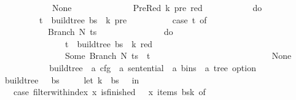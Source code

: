 \begin{isabellebody}
\ \ \ \ \ \ \ \ \ \ {\isacharbar}{\kern0pt}\ {\isacharunderscore}{\kern0pt}\ {\isasymRightarrow}\ None\isanewline
\ \ \ \ \ \ \ \ {\isacharbraceright}{\kern0pt}{\isacharparenright}{\kern0pt}\isanewline
\ \ \ \ {\isacharbar}{\kern0pt}\ PreRed\ {\isacharparenleft}{\kern0pt}k{\isacharprime}{\kern0pt}{\isacharcomma}{\kern0pt}\ pre{\isacharcomma}{\kern0pt}\ red{\isacharparenright}{\kern0pt}\ {\isacharunderscore}{\kern0pt}\ {\isasymRightarrow}\ {\isacharparenleft}{\kern0pt}\isanewline
\ \ \ \ \ \ \ \ do\ {\isacharbraceleft}{\kern0pt}\isanewline
\ \ \ \ \ \ \ \ \ \ t\ {\isasymleftarrow}\ build{\isacharunderscore}{\kern0pt}tree{\isacharprime}{\kern0pt}\ bs\ {\isasymomega}\ k{\isacharprime}{\kern0pt}\ pre{\isacharsemicolon}{\kern0pt}\isanewline
\ \ \ \ \ \ \ \ \ \ case\ t\ of\isanewline
\ \ \ \ \ \ \ \ \ \ \ \ Branch\ N\ ts\ {\isasymRightarrow}\isanewline
\ \ \ \ \ \ \ \ \ \ \ \ \ \ do\ {\isacharbraceleft}{\kern0pt}\isanewline
\ \ \ \ \ \ \ \ \ \ \ \ \ \ \ \ t\ {\isasymleftarrow}\ build{\isacharunderscore}{\kern0pt}tree{\isacharprime}{\kern0pt}\ bs\ {\isasymomega}\ k\ red{\isacharsemicolon}{\kern0pt}\isanewline
\ \ \ \ \ \ \ \ \ \ \ \ \ \ \ \ Some\ {\isacharparenleft}{\kern0pt}Branch\ N\ {\isacharparenleft}{\kern0pt}ts\ {\isacharat}{\kern0pt}\ {\isacharbrackleft}{\kern0pt}t{\isacharbrackright}{\kern0pt}{\isacharparenright}{\kern0pt}{\isacharparenright}{\kern0pt}\isanewline
\ \ \ \ \ \ \ \ \ \ \ \ \ \ {\isacharbraceright}{\kern0pt}\isanewline
\ \ \ \ \ \ \ \ \ \ {\isacharbar}{\kern0pt}\ {\isacharunderscore}{\kern0pt}\ {\isasymRightarrow}\ None\isanewline
\ \ \ \ \ \ \ \ {\isacharbraceright}{\kern0pt}{\isacharparenright}{\kern0pt}\isanewline
\ \ {\isacharparenright}{\kern0pt}{\isacharparenright}{\kern0pt}{\isachardoublequoteclose}\isanewline
\isanewline
{}\isamarkupfalse%
\ build{\isacharunderscore}{\kern0pt}tree\ {\isacharcolon}{\kern0pt}{\isacharcolon}{\kern0pt}\ {\isachardoublequoteopen}{\isacharprime}{\kern0pt}a\ cfg\ {\isasymRightarrow}\ {\isacharprime}{\kern0pt}a\ sentential\ {\isasymRightarrow}\ {\isacharprime}{\kern0pt}a\ bins\ {\isasymRightarrow}\ {\isacharprime}{\kern0pt}a\ tree\ option{\isachardoublequoteclose}\ \isanewline
\ \ {\isachardoublequoteopen}build{\isacharunderscore}{\kern0pt}tree\ {\isasymG}\ {\isasymomega}\ bs\ {\isasymequiv}\isanewline
\ \ \ \ let\ k\ {\isacharequal}{\kern0pt}\ {\isacharbar}{\kern0pt}bs{\isacharbar}{\kern0pt}\ {\isacharminus}{\kern0pt}\ {}\ in\ {\isacharparenleft}{\kern0pt}\isanewline
\ \ \ \ case\ filter{\isacharunderscore}{\kern0pt}with{\isacharunderscore}{\kern0pt}index\ {\isacharparenleft}{\kern0pt}{\isasymlambda}x{\isachardot}{\kern0pt}\ is{\isacharunderscore}{\kern0pt}finished\ {\isasymG}\ {\isasymomega}\ x{\isacharparenright}{\kern0pt}\ {\isacharparenleft}{\kern0pt}items\ {\isacharparenleft}{\kern0pt}bs{\isacharbang}{\kern0pt}k{\isacharparenright}{\kern0pt}{\isacharparenright}{\kern0pt}\ of\isanewline

\end{isabellebody}

